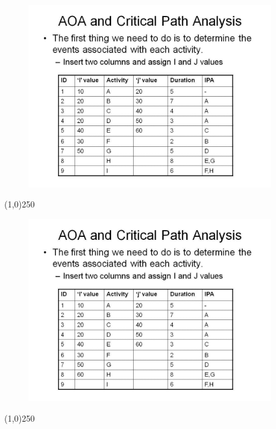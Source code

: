 \begin{frame}
\begin{figure}
	\centering
		\includegraphics[width = 10.5cm]{oldnotes/Slide71.jpg}
\end{figure}
\end{frame}
\begin{center}\line(1,0){250}\end{center}


\begin{frame}
\begin{figure}
	\centering
		\includegraphics[width = 10.5cm]{oldnotes/Slide72.jpg}
\end{figure}
\end{frame}
\begin{center}\line(1,0){250}\end{center}


